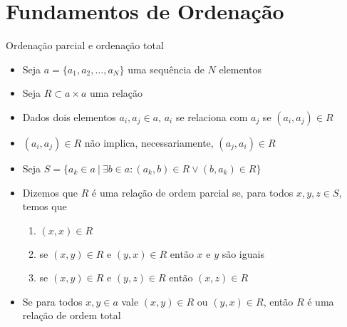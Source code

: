 \section{Fundamentos de Ordenação}

\begin{frame}[fragile]{Ordenação parcial e ordenação total}

    \begin{itemize}
        \item Seja $a = \lbrace a_1, a_2, \ldots, a_N\rbrace $ uma sequência de 
        $N$ elementos

        \item Seja $R\subset a\times a$ uma relação 

        \item Dados dois elementos $a_i, a_j\in a$, $a_i$ se relaciona com $a_j$ se 
            $(a_i, a_j)\in R$ 

        \item $(a_i, a_j)\in R$ não implica, necessariamente, $(a_j, a_i)\in R$

        \item Seja $S = \lbrace a_k\in a\ | \ \exists b\in a : (a_k, b)\in R \vee (b, a_k)\in R
            \rbrace$

        \item Dizemos que $R$ é uma relação de ordem parcial se, para todos $x, y, z\in S$, 
            temos que
            \begin{enumerate}
                \item $(x, x)\in R$
                \item se $(x, y)\in R$ e $(y, x)\in R$ então $x$ e $y$ são iguais
                \item se $(x, y)\in R$ e $(y, z)\in R$ então $(x, z)\in R$
            \end{enumerate}

        \item Se para todos $x, y\in a$ vale $(x, y)\in R$ ou $(y, x)\in R$, então $R$ é uma
            relação de ordem total
    \end{itemize}

\end{frame}

